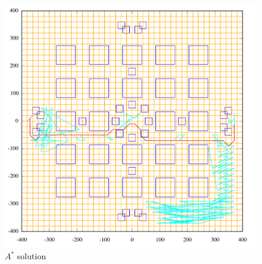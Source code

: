 \begin{figure}\label{fig:astar}
\begin{center}\centering
\includegraphics[width=\textwidth]{astar.png}
\caption{$A^*$ solution}
\end{center}
\end{figure}

